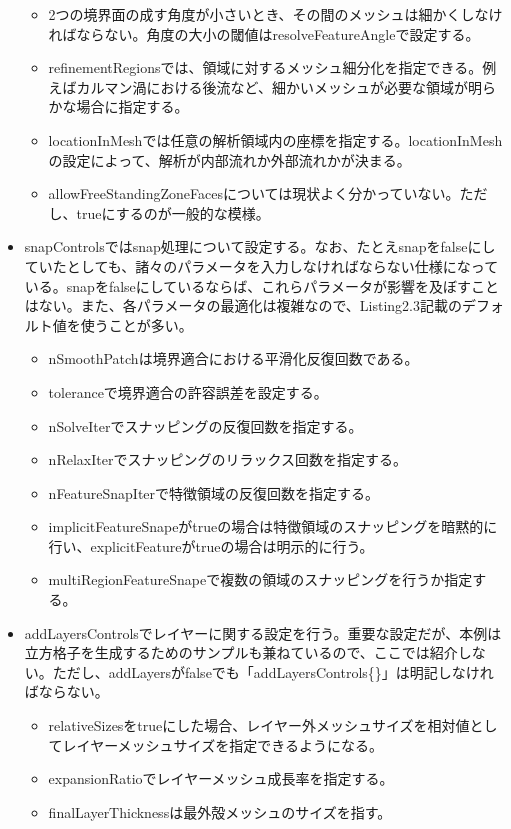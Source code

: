\documentclass[dvipdfmx, 9pt, a4paper]{jsarticle}
\numberwithin{equation}{section}
\begin{document}
\begin{itemize}
\begin{itemize}
\item 2つの境界面の成す角度が小さいとき、その間のメッシュは細かくしなければならない。角度の大小の閾値はresolveFeatureAngleで設定する。
\item refinementRegionsでは、領域に対するメッシュ細分化を指定できる。例えばカルマン渦における後流など、細かいメッシュが必要な領域が明らかな場合に指定する。
\item locationInMeshでは任意の解析領域内の座標を指定する。locationInMeshの設定によって、解析が内部流れか外部流れかが決まる。
\item allowFreeStandingZoneFacesについては現状よく分かっていない。ただし、trueにするのが一般的な模様。
\end{itemize}
\item snapControlsではsnap処理について設定する。なお、たとえsnapをfalseにしていたとしても、諸々のパラメータを入力しなければならない仕様になっている。snapをfalseにしているならば、これらパラメータが影響を及ぼすことはない。また、各パラメータの最適化は複雑なので、Listing2.3記載のデフォルト値を使うことが多い。
\begin{itemize}
\item nSmoothPatchは境界適合における平滑化反復回数である。
\item toleranceで境界適合の許容誤差を設定する。
\item nSolveIterでスナッピングの反復回数を指定する。
\item nRelaxIterでスナッピングのリラックス回数を指定する。
\item nFeatureSnapIterで特徴領域の反復回数を指定する。
\item implicitFeatureSnapeがtrueの場合は特徴領域のスナッピングを暗黙的に行い、explicitFeatureがtrueの場合は明示的に行う。
\item multiRegionFeatureSnapeで複数の領域のスナッピングを行うか指定する。
\end{itemize}
\item addLayersControlsでレイヤーに関する設定を行う。重要な設定だが、本例は立方格子を生成するためのサンプルも兼ねているので、ここでは紹介しない。ただし、addLayersがfalseでも「addLayersControls\{\}」は明記しなければならない。
\begin{itemize}
\item relativeSizesをtrueにした場合、レイヤー外メッシュサイズを相対値としてレイヤーメッシュサイズを指定できるようになる。
\item expansionRatioでレイヤーメッシュ成長率を指定する。
\item finalLayerThicknessは最外殻メッシュのサイズを指す。

\end{itemize}
\end{itemize}
\end{document}
